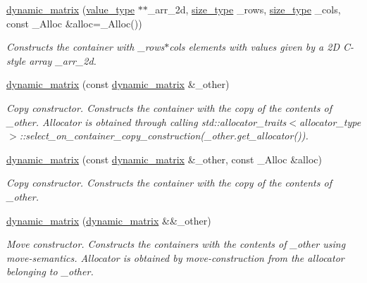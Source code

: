 \begin{DoxyCompactItemize}
\hyperlink{classcrsc_1_1dynamic__matrix_aa766e75f81772f74c67064fae655308b}{dynamic\+\_\+matrix} (\hyperlink{classcrsc_1_1dynamic__matrix_a27b83d28002e3e2bb316f1f0460e9cca}{value\+\_\+type} $\ast$$\ast$\+\_\+arr\+\_\+2d, \hyperlink{classcrsc_1_1dynamic__matrix_a52b776dc7f60d8798c884d7d3c361a8a}{size\+\_\+type} \+\_\+rows, \hyperlink{classcrsc_1_1dynamic__matrix_a52b776dc7f60d8798c884d7d3c361a8a}{size\+\_\+type} \+\_\+cols, const \+\_\+\+Alloc \&alloc=\+\_\+\+Alloc())
\begin{DoxyCompactList}\small\item\em Constructs the container with {\ttfamily \+\_\+rows$\ast$cols} elements with values given by a 2D C-\/style array {\ttfamily \+\_\+arr\+\_\+2d}. \end{DoxyCompactList}\item 
\hyperlink{classcrsc_1_1dynamic__matrix_a50c449bfc6a670c1d88cba8fcb71153d}{dynamic\+\_\+matrix} (const \hyperlink{classcrsc_1_1dynamic__matrix}{dynamic\+\_\+matrix} \&\+\_\+other)
\begin{DoxyCompactList}\small\item\em Copy constructor. Constructs the container with the copy of the contents of {\ttfamily \+\_\+other}. Allocator is obtained through calling {\ttfamily std\+::allocator\+\_\+traits$<$allocator\+\_\+type$>$\+::select\+\_\+on\+\_\+container\+\_\+copy\+\_\+construction(\+\_\+other.\+get\+\_\+allocator())}. \end{DoxyCompactList}\item 
\hyperlink{classcrsc_1_1dynamic__matrix_a7590f2b0b645a72b296d3352267f3ffa}{dynamic\+\_\+matrix} (const \hyperlink{classcrsc_1_1dynamic__matrix}{dynamic\+\_\+matrix} \&\+\_\+other, const \+\_\+\+Alloc \&alloc)
\begin{DoxyCompactList}\small\item\em Copy constructor. Constructs the container with the copy of the contents of {\ttfamily \+\_\+other}. \end{DoxyCompactList}\item 
\hyperlink{classcrsc_1_1dynamic__matrix_a9a87bbd46e76c29c58084b3ad96f47ee}{dynamic\+\_\+matrix} (\hyperlink{classcrsc_1_1dynamic__matrix}{dynamic\+\_\+matrix} \&\&\+\_\+other)
\begin{DoxyCompactList}\small\item\em Move constructor. Constructs the containers with the contents of {\ttfamily \+\_\+other} using move-\/semantics. Allocator is obtained by move-\/construction from the allocator belonging to {\ttfamily \+\_\+other}. \end{DoxyCompactList}\item 
$$
\end{DoxyCompactItemize}
